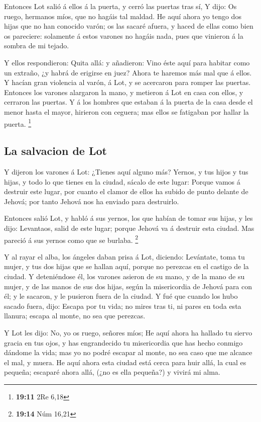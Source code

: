  Entonces Lot salió á ellos á la puerta, y cerró las puertas
tras sí,  Y dijo: Os ruego, hermanos míos, que no hagáis tal
maldad.  He aquí ahora yo tengo dos hijas que no han
conocido varón; os las sacaré afuera, y haced de ellas como bien os
pareciere: solamente á estos varones no hagáis nada, pues que vinieron á
la sombra de mi tejado.

 Y ellos respondieron: Quita allá: y añadieron: Vino éste
aquí para habitar como un extraño, ¿y habrá de erigirse en juez? Ahora
te haremos más mal que á ellos. Y hacían gran violencia al varón, á Lot,
y se acercaron para romper las puertas.  Entonces los
varones alargaron la mano, y metieron á Lot en casa con ellos, y
cerraron las puertas.  Y á los hombres que estaban á la
puerta de la casa desde el menor hasta el mayor, hirieron con ceguera;
mas ellos se fatigaban por hallar la puerta. \footnote{\textbf{19:11}
  2Re 6,18}

\hypertarget{la-salvacion-de-lot}{%
\subsection{La salvacion de Lot}\label{la-salvacion-de-lot}}

 Y dijeron los varones á Lot: ¿Tienes aquí alguno más?
Yernos, y tus hijos y tus hijas, y todo lo que tienes en la ciudad,
sácalo de este lugar:  Porque vamos á destruir este lugar,
por cuanto el clamor de ellos ha subido de punto delante de Jehová; por
tanto Jehová nos ha enviado para destruirlo.

 Entonces salió Lot, y habló á sus yernos, los que habían
de tomar sus hijas, y les dijo: Levantaos, salid de este lugar; porque
Jehová va á destruir esta ciudad. Mas pareció á sus yernos como que se
burlaba. \footnote{\textbf{19:14} Núm 16,21}

 Y al rayar el alba, los ángeles daban prisa á Lot,
diciendo: Levántate, toma tu mujer, y tus dos hijas que se hallan aquí,
porque no perezcas en el castigo de la ciudad.  Y
deteniéndose él, los varones asieron de su mano, y de la mano de su
mujer, y de las manos de sus dos hijas, según la misericordia de Jehová
para con él; y le sacaron, y le pusieron fuera de la ciudad.
 Y fué que cuando los hubo sacado fuera, dijo: Escapa por
tu vida; no mires tras ti, ni pares en toda esta llanura; escapa al
monte, no sea que perezcas.

 Y Lot les dijo: No, yo os ruego, señores míos;
 He aquí ahora ha hallado tu siervo gracia en tus ojos, y
has engrandecido tu misericordia que has hecho conmigo dándome la vida;
mas yo no podré escapar al monte, no sea caso que me alcance el mal, y
muera.  He aquí ahora esta ciudad está cerca para huir
allá, la cual es pequeña; escaparé ahora allá, (¿no es ella pequeña?) y
vivirá mi alma.

